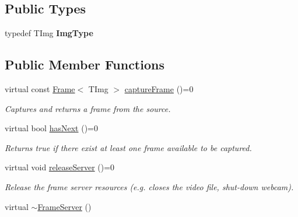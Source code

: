 \subsection*{Public Types}
\begin{DoxyCompactItemize}
\item 
\hypertarget{class_vision_core_1_1_interfaces_1_1_frame_server_aaafe8051ac78bd4d8ed3027acd24a1c0}{}typedef T\+Img {\bfseries Img\+Type}\label{class_vision_core_1_1_interfaces_1_1_frame_server_aaafe8051ac78bd4d8ed3027acd24a1c0}

\end{DoxyCompactItemize}
\subsection*{Public Member Functions}
\begin{DoxyCompactItemize}
\item 
virtual const \hyperlink{struct_vision_core_1_1_data_structures_1_1_frame}{Frame}$<$ T\+Img $>$ \hyperlink{class_vision_core_1_1_interfaces_1_1_frame_server_a8d2ffbcea7c28182a48f32e86f830e12}{capture\+Frame} ()=0
\begin{DoxyCompactList}\small\item\em Captures and returns a frame from the source. \end{DoxyCompactList}\item 
\hypertarget{class_vision_core_1_1_interfaces_1_1_frame_server_ac7d6b5c759a38e9e376f500f7155a679}{}virtual bool \hyperlink{class_vision_core_1_1_interfaces_1_1_frame_server_ac7d6b5c759a38e9e376f500f7155a679}{has\+Next} ()=0\label{class_vision_core_1_1_interfaces_1_1_frame_server_ac7d6b5c759a38e9e376f500f7155a679}

\begin{DoxyCompactList}\small\item\em Returns true if there exist at least one frame available to be captured. \end{DoxyCompactList}\item 
\hypertarget{class_vision_core_1_1_interfaces_1_1_frame_server_a6a81377750a63504ad091b831cbb7786}{}virtual void \hyperlink{class_vision_core_1_1_interfaces_1_1_frame_server_a6a81377750a63504ad091b831cbb7786}{release\+Server} ()=0\label{class_vision_core_1_1_interfaces_1_1_frame_server_a6a81377750a63504ad091b831cbb7786}

\begin{DoxyCompactList}\small\item\em Release the frame server resources (e.\+g. closes the video file, shut-\/down webcam). \end{DoxyCompactList}\item 
\hypertarget{class_vision_core_1_1_interfaces_1_1_frame_server_ae302d35f6c7ab3201fe7bfc5e07e0154}{}virtual \hyperlink{class_vision_core_1_1_interfaces_1_1_frame_server_ae302d35f6c7ab3201fe7bfc5e07e0154}{$\sim$\+Frame\+Server} ()\label{class_vision_core_1_1_interfaces_1_1_frame_server_ae302d35f6c7ab3201fe7bfc5e07e0154}


\end{DoxyCompactItemize}
